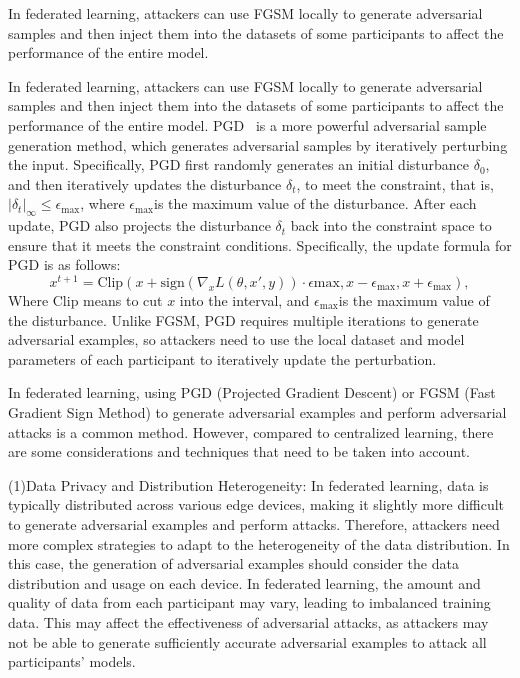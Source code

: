 In federated learning, attackers can use FGSM locally to generate
adversarial samples and then inject them into the datasets of some participants
to affect the performance of the entire model.

In federated learning, attackers can use FGSM locally
to generate adversarial samples and then inject them into
the datasets of some participants to affect the performance
of the entire model. PGD~\cite{madry2017towards} is a more powerful adversarial sample
generation method, which generates adversarial samples
by iteratively perturbing the input. Specifically, PGD
first randomly generates an initial disturbance $\delta_0$,
and then iteratively updates the disturbance $\delta_t$, to meet the constraint,
that is, $|\delta_t|_{\infty} \leq \epsilon_{\text{max}}$,
where $\epsilon_{\text{max}}$is the maximum value of the disturbance.
After each update, PGD also projects the disturbance
$\delta_t$ back into the constraint space to ensure that it meets the
constraint conditions.
Specifically, the update formula for PGD is as follows:
\begin{equation}
    x^{t+1} = \text{Clip}(x + \text{sign}(\nabla_x L(\theta,x',y)) \cdot \epsilon{\text{max}}, x - \epsilon_{\text{max}}, x + \epsilon_{\text{max}}),
\end{equation}
Where $\text{Clip}$ means to cut $x$ into the interval, and $\epsilon_ {\text{max}} $is the maximum value of the disturbance.
Unlike FGSM, PGD requires multiple iterations to generate adversarial examples,
so attackers need to use the local dataset and model parameters of each participant
to iteratively update the perturbation.

In federated learning, using PGD (Projected Gradient Descent) or FGSM
(Fast Gradient Sign Method) to generate adversarial examples and perform
adversarial attacks is a common method. However, compared to centralized
learning, there are some considerations and techniques that need to be
taken into account. 

(1)Data Privacy and Distribution Heterogeneity: In
federated learning, data is typically distributed across 
various edge devices, making it slightly more diﬀicult to
generate adversarial examples and perform attacks. 
Therefore, attackers need more complex strategies to adapt to
the heterogeneity of the data distribution. In this case,
the generation of adversarial examples should consider the
data distribution and usage on each device. In federated
learning, the amount and quality of data from each
participant may vary, leading to imbalanced training data.
This may affect the effectiveness of adversarial attacks, as
attackers may not be able to generate suﬀiciently accurate
adversarial examples to attack all participants' models.  

